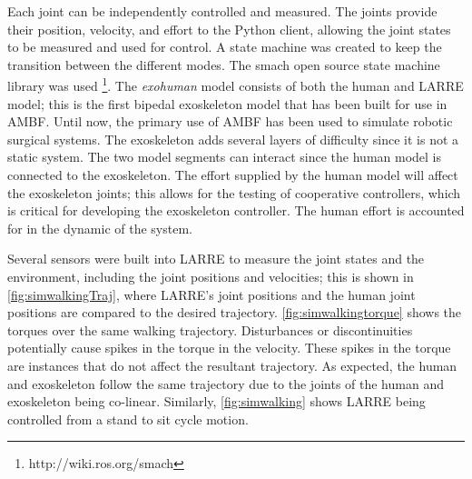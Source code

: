  
 Each joint can be independently controlled and measured. The joints provide their position, velocity, and effort to the Python client, allowing the joint states to be measured and used for control. A state machine was created to keep the transition between the different modes. The smach open source state machine library was used \footnote{http://wiki.ros.org/smach}. The \textit{exohuman} model consists of both the human and LARRE model; this is the first bipedal exoskeleton model that has been built for use in AMBF. Until now, the primary use of AMBF has been used to simulate robotic surgical systems. The exoskeleton adds several layers of difficulty since it is not a static system. The two model segments can interact since the human model is connected to the exoskeleton. The effort supplied by the human model will affect the exoskeleton joints; this allows for the testing of cooperative controllers, which is critical for developing the exoskeleton controller. The human effort is accounted for in the dynamic of the system.  
 
 
 Several sensors were built into LARRE to measure the joint states and the environment, including the joint positions and velocities; this is shown in \autoref{fig:simwalkingTraj}, where LARRE's joint positions and the human joint positions are compared to the desired trajectory.  \autoref{fig:simwalkingtorque} shows the torques over the same walking trajectory. Disturbances or discontinuities potentially cause spikes in the torque in the velocity. These spikes in the torque are instances that do not affect the resultant trajectory. As expected, the human and exoskeleton follow the same trajectory due to the joints of the human and exoskeleton being co-linear. Similarly, \autoref{fig:simwalking} shows LARRE being controlled from a stand to sit cycle motion.
 
